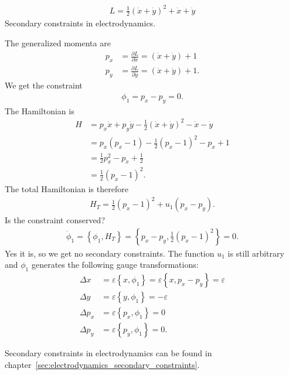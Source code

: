 \begin{exercise}
\begin{align*}
L = \frac{1}{2} (\dot{x} + \dot{y})^2 + \dot{x} + \dot{y}
\end{align*}
Secondary constraints in electrodynamics.
\end{exercise}
\begin{solution}
The generalized momenta are
\begin{align*}
p_x &= \frac{\partial L}{\partial \dot{x}} = (\dot{x} + \dot{y}) + 1 \\
p_y &= \frac{\partial L}{\partial \dot{y}} = (\dot{x} + \dot{y}) + 1.
\end{align*}
We get the constraint 
\begin{align*}
\phi_1 = p_x - p_y = 0.
\end{align*}
The Hamiltonian is
\begin{align*}
H &= p_x \dot{x} + p_y \dot{y} - \frac{1}{2} (\dot{x} + \dot{y})^2 - \dot{x} - \dot{y} \\
&= p_x (p_x - 1) - \frac{1}{2} (p_x - 1)^2 - p_x + 1 \\
&= \frac{1}{2} p_x^2 - p_x + \frac{1}{2} \\
&= \frac{1}{2} (p_x - 1)^2.
\end{align*}
The total Hamiltonian is therefore
\begin{align*}
H_T = \frac{1}{2} (p_x - 1)^2 + u_1 (p_x - p_y).
\end{align*}
Is the constraint conserved?
\begin{align*}
\dot{\phi}_1 = \left \{ \phi_1,H_T \right \} = \left \{ p_x - p_y,\frac{1}{2} (p_x - 1)^2 \right \} = 0.
\end{align*}
Yes it is, so we get no secondary constraints. The function $u_1$ is still arbitrary and $\phi_1$ generates the following gauge transformations:
\begin{align*}
\Delta x &= \varepsilon \left \{ x,\phi_1 \right \} = \varepsilon \left \{ x,p_x - p_y \right \} = \varepsilon \\
\Delta y &= \varepsilon \left \{ y,\phi_1 \right \} = - \varepsilon \\
\Delta p_x &= \varepsilon \left \{ p_x,\phi_1 \right \} = 0 \\
\Delta p_y &= \varepsilon \left \{ p_y,\phi_1 \right \} = 0.
\end{align*}

Secondary constraints in electrodynamics can be found in chapter~\vref{sec:electrodynamics_secondary_constraints}.
\end{solution}


